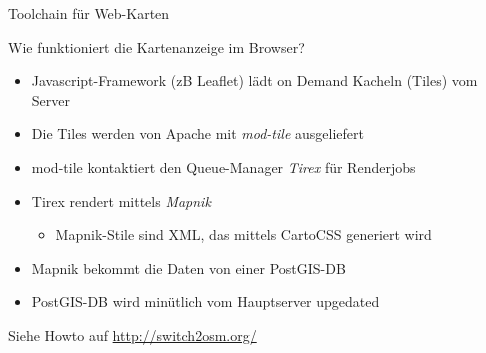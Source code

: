 \documentclass[handout]{beamer}
\begin{document}
    

\begin{frame}{Toolchain für Web-Karten}

Wie funktioniert die Kartenanzeige im Browser?
\pause

\begin{itemize}
  \item Javascript-Framework (zB Leaflet) lädt on Demand Kacheln (Tiles) vom Server
  \item Die Tiles werden von  Apache mit \emph{mod-tile} ausgeliefert
  \item mod-tile kontaktiert den Queue-Manager \emph{Tirex} für Renderjobs
  \item Tirex rendert mittels \emph{Mapnik}
  \begin{itemize}
    \item Mapnik-Stile sind XML, das mittels CartoCSS generiert wird
  \end{itemize}
  \item Mapnik bekommt die Daten von einer PostGIS-DB
  \item PostGIS-DB wird minütlich vom Hauptserver upgedated
\end{itemize}

Siehe Howto auf \url{http://switch2osm.org/}

\end{frame}
\end{document}

